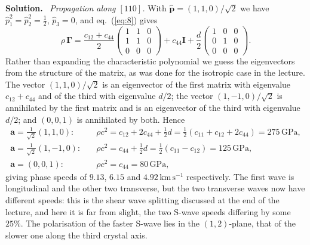 \documentclass[a4paper,12pt]{paper}
\newenvironment{solution}{\par\noindent\textbf{Solution.}\ }{\par\medskip}
\begin{document}
\begin{solution}
\emph{Propagation along $[110]$.} With $\hat{\mathbf{p}}=(1,1,0)/\sqrt{2}$ we have
$\hat{p}_{1}^{2}=\hat{p}_{2}^{2}=\tfrac{1}{2}$, $\hat{p}_{3}=0$, and eq.~(\ref{eq:8}) gives
\begin{equation}
\rho\,\bm{\Gamma}=\frac{c_{12}+c_{44}}{2}\begin{pmatrix}1&1&0\\1&1&0\\0&0&0\end{pmatrix}
+c_{44}\mathbf{I}+\frac{d}{2}\begin{pmatrix}1&0&0\\0&1&0\\0&0&0\end{pmatrix}.
\label{eq:10}
\end{equation}
Rather than expanding the characteristic polynomial we guess the eigenvectors from the structure
of the matrix, as was done for the isotropic case in the lecture. The vector $(1,1,0)/\sqrt{2}$
is an eigenvector of the first matrix with eigenvalue $c_{12}+c_{44}$ and of the third with
eigenvalue $d/2$; the vector $(1,-1,0)/\sqrt{2}$ is annihilated by the first matrix and is an
eigenvector of the third with eigenvalue $d/2$; and $(0,0,1)$ is annihilated by both. Hence
\begin{equation}
\begin{split}
\mathbf{a}=\tfrac{1}{\sqrt{2}}(1,1,0):&\quad \rho c^{2}=c_{12}+2c_{44}+\tfrac{1}{2}d=\tfrac{1}{2}(c_{11}+c_{12}+2c_{44})=275\,\mathrm{GPa},\\
\mathbf{a}=\tfrac{1}{\sqrt{2}}(1,-1,0):&\quad \rho c^{2}=c_{44}+\tfrac{1}{2}d=\tfrac{1}{2}(c_{11}-c_{12})=125\,\mathrm{GPa},\\
\mathbf{a}=(0,0,1):&\quad \rho c^{2}=c_{44}=80\,\mathrm{GPa},
\end{split}
\label{eq:11}
\end{equation}
giving phase speeds of $9.13$, $6.15$ and $4.92\,\mathrm{km\,s^{-1}}$ respectively. The first
wave is longitudinal and the other two transverse, but the two transverse waves now have
different speeds: this is the shear wave splitting discussed at the end of the lecture, and here
it is far from slight, the two S-wave speeds differing by some $25\%$. The polarisation of the
faster S-wave lies in the $(1,2)$-plane, that of the slower one along the third crystal axis.


\end{solution}
\end{document}

